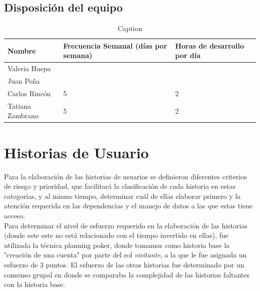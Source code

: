 \documentclass[a4paper,12 pt]{article}
\begin{document}
\subsection{Disposición del equipo}

\begin{table}[H]
    \centering
    \small{
    \begin{tabular}{|M{2cm}|M{4cm}|M{4cm}|}
        \hline
        \textbf{Nombre}    & \textbf{Frecuencia Semanal (días por semana)}   
        &\textbf{Horas de desarrollo por día}\\
        \hline
        Valeria Huepa   &       &       \\
        \hline
        Juan Peña       &       &       \\
        \hline
        Carlos Rincón   &   5    &  2     \\
        \hline
        Tatiana Zambrano    & 5      &  2     \\
        \hline
    \end{tabular}
    \caption{Caption}
    \label{tab:my_label}}
\end{table}{}

\section{Historias de Usuario}

Para la elaboración de las historias de usuarios se definieron diferentes criterios de
riesgo y prioridad, que facilitará la clasificación de cada historia en estas
categorías, y al mismo tiempo, determinar cuál de ellas elaborar primero y la atención
requerida en las dependencias y el manejo de datos a las que estas tiene acceso.\\

Para determinar el nivel de esfuerzo requerido en la elaboración de las historias (donde
este este no está relacionado con el tiempo invertido en ellas), fue utilizada la
técnica planning poker, donde tomamos como historia base la "creación de una cuenta" por
parte del rol \textit{visitante}, a la que le fue asignada un esfuerzo de 3 puntos. El
esfuerzo de las otras historias fue determinado por un consenso grupal en donde se
comparaba la complejidad de las historias faltantes con la historia base.\\
\end{document}
